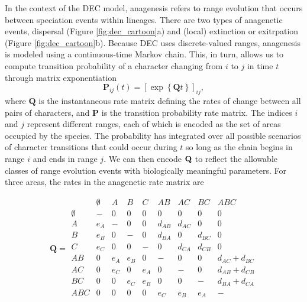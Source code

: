 In the context of the DEC model, anagenesis refers to range evolution that occurs between speciation events within lineages.
There are two types of anagenetic events, dispersal (Figure \ref{fig:dec_cartoon}a) and (local) extinction or exitrpation (Figure \ref{fig:dec_cartoon}b).
Because DEC uses discrete-valued ranges, anagenesis is modeled using a continuous-time Markov chain.
This, in turn, allows us to compute transition probability of a character changing from $i$ to $j$ in time $t$ through matrix exponentiation
\[
\mathbf{P}_{ij}(t) = \left[ \exp \left\lbrace \mathbf{Q}t \right\rbrace \right]_{ij},
\]
where $\textbf{Q}$ is the instantaneous rate matrix defining the rates of change between all pairs of characters, and $\textbf{P}$ is the transition probability rate matrix.
The indices $i$ and $j$ represent different ranges, each of which is encoded as the set of areas occupied by the species.
The probability has integrated over all possible scenarios of character transitions that could occur during $t$ so long as the chain begins in range $i$ and ends in range $j$.
We can then encode ${\bf Q}$ to reflect the allowable classes of range evolution events with biologically meaningful parameters.
For three areas, the rates in the anagenetic rate matrix are

\[
\textbf{Q} = 
	\begin{array}{c|cccccccc}
		& \emptyset & A & B & C & AB & AC & BC & ABC \\
		\hline
		\emptyset 	& - 	& 0 	& 0 	& 0 		& 0			& 0 		& 0 		& 0 \\
		A 			& e_A 	& - 	& 0 	& 0 		& d_{AB}	& d_{AC} 	& 0 		& 0 \\
		B 			& e_B 	& 0 	& - 	& 0 		& d_{BA}	& 0 		& d_{BC} 	& 0 \\
		C 			& e_C 	& 0 	& 0 	& - 		& 0 		& d_{CA} 	& d_{CB} 	& 0 \\
		AB 			& 0 	& e_A 	& e_B 	& 0 		& -			& 0 		& 0 		& d_{AC} + d_{BC} \\
		AC 			& 0 	& e_C 	& 0 	& e_A 		& 0			& - 		& 0 		& d_{AB} + d_{CB} \\
		BC 			& 0 	& 0 	& e_C 	& e_B 		& 0			& 0 		& - 		& d_{BA} + d_{CA} \\
		ABC 		& 0 	& 0 	& 0 	& 0 		& e_C 		& e_B 		& e_A 		& - \\								
	\end{array}
\]

